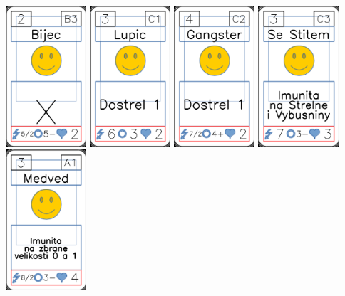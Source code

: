 \documentclass[a4paper]{article}
\begin{document}
	\includegraphics[width=3.0cm]{img-6_5}
	\includegraphics[width=3.0cm]{img-6_6}
	\includegraphics[width=3.0cm]{img-6_7}
	\includegraphics[width=3.0cm]{img-6_8}
	\includegraphics[width=3.0cm]{img-6_9}
\end{document}
